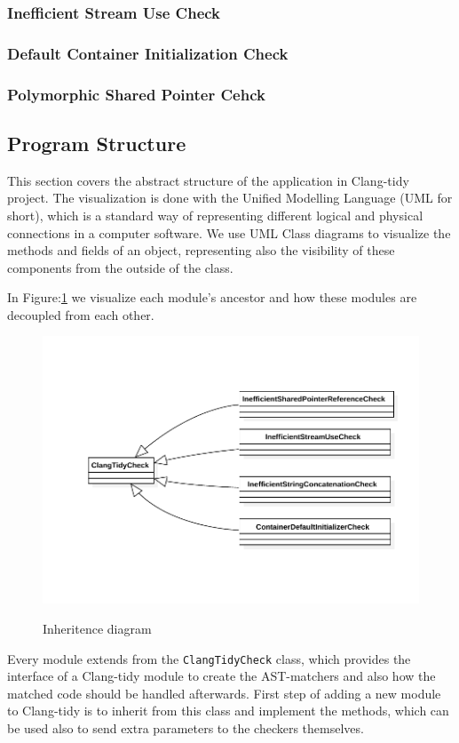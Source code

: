 \subsubsection{Inefficient Stream Use Check}
\subsubsection{Default Container Initialization Check}
\subsubsection{Polymorphic Shared Pointer Cehck}
\subsection{Program Structure}
\par This section covers the abstract structure of the application in Clang-tidy project. The visualization is done with the Unified Modelling Language (UML for short), which is a standard way of representing different logical and physical connections in a computer software. We use UML Class diagrams to visualize the methods and fields of an object, representing also the visibility of these components from the outside of the class.  \medskip
\par In Figure:\ref{inheritence} we visualize each module's ancestor and how these modules are decoupled from each other.  
\begin{figure}[H]
 	\caption{Inheritence diagram}
 	\includegraphics[scale=1]{images/inheritence.pdf}
 	\label{inheritence}
\end{figure}
\par Every module extends from the \verb|ClangTidyCheck| class, which provides the interface of a Clang-tidy module to create the AST-matchers and also how the matched code should be handled afterwards. First step of adding a new module to Clang-tidy is to inherit from this class and implement the methods, which can be used also to send extra parameters to the checkers themselves.
